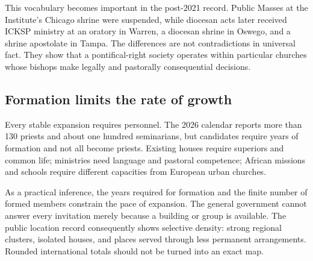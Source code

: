 This vocabulary becomes important in the post-2021 record. Public Masses at the Institute's Chicago shrine were suspended, while diocesan acts later received ICKSP ministry at an oratory in Warren, a diocesan shrine in Oswego, and a shrine apostolate in Tampa. The differences are not contradictions in universal fact. They show that a pontifical-right society operates within particular churches whose bishops make legally and pastorally consequential decisions.

\subsection{Formation limits the rate of growth}

Every stable expansion requires personnel. The 2026 calendar reports more than 130 priests and about one hundred seminarians, but candidates require years of formation and not all become priests. Existing houses require superiors and common life; ministries need language and pastoral competence; African missions and schools require different capacities from European urban churches.

As a practical inference, the years required for formation and the finite number of formed members constrain the pace of expansion. The general government cannot answer every invitation merely because a building or group is available. The public location record consequently shows selective density: strong regional clusters, isolated houses, and places served through less permanent arrangements. Rounded international totals should not be turned into an exact map.

